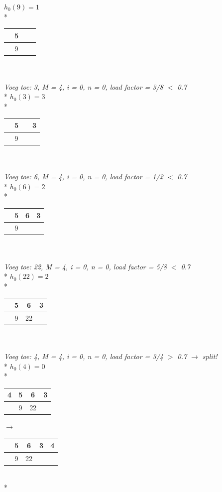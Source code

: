 \documentclass[10pt]{article}
\begin{document}
\textit{$h_0(9) = 1$}\\*
\begin{tabular}{| c | c | c | c |} \hline
   & 5 &  &\\ \hline
   & 9 &  &\\ \hline
\end{tabular}\\\\
\textit{Voeg toe: 3, M = 4, i = 0, n = 0, load factor = 3/8 $<$ 0.7}\\*
\textit{$h_0(3) = 3$}\\*
\begin{tabular}{| c | c | c | c |} \hline
   & 5 &  & 3\\ \hline
   & 9 &  &\\ \hline
\end{tabular}\\\\
\textit{Voeg toe: 6, M = 4, i = 0, n = 0, load factor = 1/2 $<$ 0.7}\\*
\textit{$h_0(6) = 2$}\\*
\begin{tabular}{| c | c | c | c |} \hline
   & 5 & 6 & 3\\ \hline
   & 9 &  &\\ \hline
\end{tabular}\\\\
\textit{Voeg toe: 22, M = 4, i = 0, n = 0, load factor = 5/8 $<$ 0.7}\\*
\textit{$h_0(22) = 2$}\\*
\begin{tabular}{| c | c | c | c |} \hline
   & 5 & 6 & 3\\ \hline
   & 9 & 22 &\\ \hline
\end{tabular}\\\\
\textit{Voeg toe: 4, M = 4, i = 0, n = 0, load factor = 3/4 $>$ 0.7 $\rightarrow$ split!}\\*
\textit{$h_0(4) = 0$}\\*
\begin{tabular}{| c | c | c | c |} \hline
  4 & 5 & 6 & 3\\ \hline
   & 9 & 22 &\\ \hline
\end{tabular} $\rightarrow$
\begin{tabular}{| c | c | c | c | c |} \hline
   & 5 & 6 & 3 & 4\\ \hline
   & 9 & 22 & & \\ \hline
\end{tabular}\\*
\end{document}
